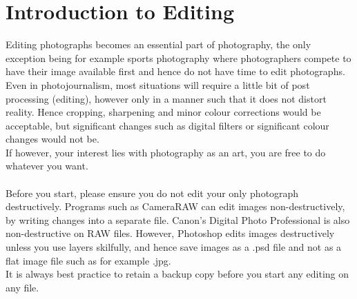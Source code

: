 \section{Introduction to Editing}

Editing photographs becomes an essential part of photography, the only exception being for example sports photography where photographers compete to have their image available first and hence do not have time to edit photographs.
\\
Even in photojournalism, most situations will require a little bit of post processing (editing), however only in a manner such that it does not distort reality. Hence cropping, sharpening and minor colour corrections would be acceptable, but significant changes such as digital filters or significant colour changes would not be.
\\
If however, your interest lies with photography as an art, you are free to do whatever you want.
\\
\\
Before you start, please ensure you do not edit your only photograph destructively. Programs such as CameraRAW can edit images non-destructively, by writing changes into a separate file. Canon's Digital Photo Professional is also non-destructive on \gls{RAW} files. However, Photoshop edits images destructively unless you use layers skilfully, and hence save images as a .psd file and not as a flat image file such as for example .jpg.
\\
It is always best practice to retain a backup copy before you start any editing on any file.